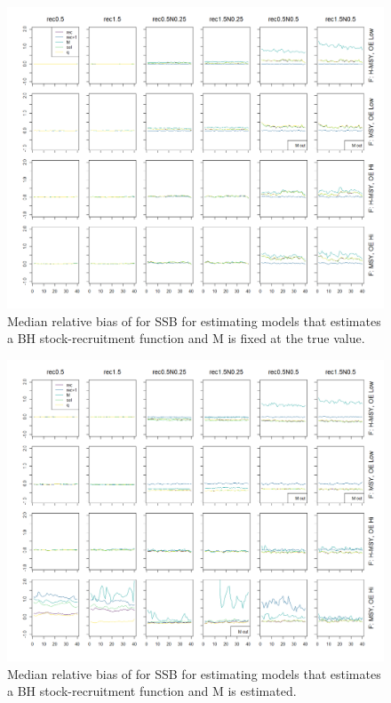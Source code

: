 \documentclass[
  12pt,
]{article}
\begin{document}
\begin{landscape}
\begin{figure}
\caption{Median relative bias of for SSB for estimating models that estimates a BH stock-recruitment function and M is fixed at the true value.}\label{naa_om_em_SR_MF_relbias_ssb}
\begin{center}
\includegraphics[width = \textwidth]{naa_om_SR_MF_relbias_ssb.png}
\end{center}
\end{figure}
\end{landscape}

\begin{landscape}
\begin{figure}
\caption{Median relative bias of for SSB for estimating models that estimates a BH stock-recruitment function and M is estimated.}\label{naa_om_em_SR_ME_relbias_ssb}
\begin{center}
\includegraphics[width = \textwidth]{naa_om_SR_ME_relbias_ssb.png}
\end{center}
\end{figure}
\end{landscape}
\end{document}
